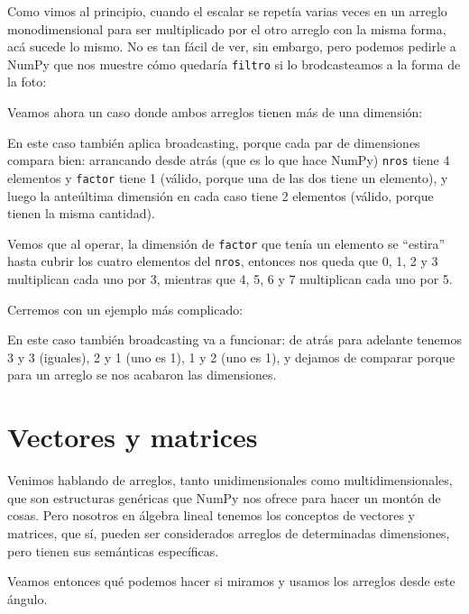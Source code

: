 Como vimos al principio, cuando el escalar se repetía varias veces en un arreglo monodimensional para ser multiplicado por el otro arreglo con la misma forma, acá sucede lo mismo. No es tan fácil de ver, sin embargo, pero podemos pedirle a NumPy que nos muestre cómo quedaría \verb|filtro| si lo brodcasteamos a la forma de la foto:


Veamos ahora un caso donde ambos arreglos tienen más de una dimensión:


En este caso también aplica broadcasting, porque cada par de dimensiones compara bien: arrancando desde atrás (que es lo que hace NumPy) \verb|nros| tiene 4 elementos y \verb|factor| tiene 1 (válido, porque una de las dos tiene un elemento), y luego la anteúltima dimensión en cada caso tiene 2 elementos (válido, porque tienen la misma cantidad).


Vemos que al operar, la dimensión de \verb|factor| que tenía un elemento se ``estira'' hasta cubrir los cuatro elementos del \verb|nros|, entonces nos queda que 0, 1, 2 y 3 multiplican cada uno por 3, mientras que 4, 5, 6 y 7 multiplican cada uno por 5.

Cerremos con un ejemplo más complicado:


En este caso también broadcasting va a funcionar: de atrás para adelante tenemos 3 y 3 (iguales), 2 y 1 (uno es 1), 1 y 2 (uno es 1), y dejamos de comparar porque para un arreglo se nos acabaron las dimensiones.



\section{Vectores y matrices}

Venimos hablando de arreglos, tanto unidimensionales como multidimensionales, que son estructuras genéricas que NumPy nos ofrece para hacer un montón de cosas. Pero nosotros en álgebra lineal tenemos los conceptos de vectores y matrices, que sí, pueden ser considerados arreglos de determinadas dimensiones, pero tienen sus semánticas específicas.

Veamos entonces qué podemos hacer si miramos y usamos los arreglos desde este ángulo.

